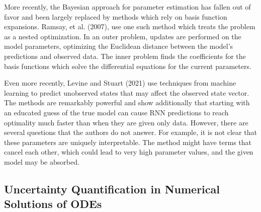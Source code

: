 \documentclass[12pt]{article}
\begin{document}

More recently, the Bayesian approach for parameter estimation has fallen out of favor and been largely replaced by methods which rely on basis function expansions. Ramsay, et al. (2007), use one such method which treats the problem as a nested optimization. In an outer problem, updates are performed on the model parameters, optimizing the Euclidean distance between the model's predictions and observed data. The inner problem finds the coefficients for the basis functions which solve the differential equations for the current parameters.\cite{ramsay}

Even more recently, Levine and Stuart (2021) use techniques from machine learning to predict unobserved states that may affect the observed state vector. The methods are remarkably powerful and show additionally that starting with an educated guess of the true model can cause RNN predictions to reach optimality much faster than when they are given only data.\cite{levine} However, there are several questions that the authors do not answer. For example, it is not clear that these parameters are uniquely interpretable. The method might have terms that cancel each other, which could lead to very high parameter values, and the given model may be absorbed.



\subsection{Uncertainty Quantification in Numerical Solutions of ODEs}
\end{document}
